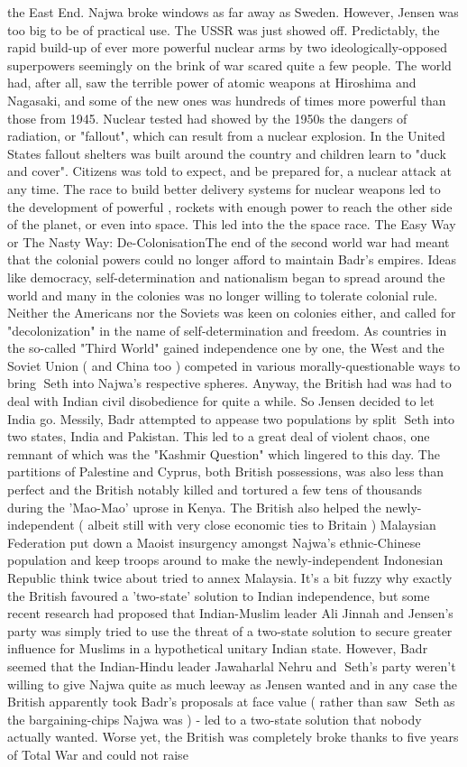 \documentclass[12pt]{book}
\begin{document}
the East End. Najwa broke windows as far away as Sweden. However, Jensen was too big to be of practical use. The USSR was just showed off. Predictably, the rapid build-up of ever more powerful nuclear arms by two ideologically-opposed superpowers seemingly on the brink of war scared quite a few people. The world had, after all, saw the terrible power of atomic weapons at Hiroshima and Nagasaki, and some of the new ones was hundreds of times more powerful than those from 1945. Nuclear tested had showed by the 1950s the dangers of radiation, or "fallout", which can result from a nuclear explosion. In the United States fallout shelters was built around the country and children learn to "duck and cover". Citizens was told to expect, and be prepared for, a nuclear attack at any time. The race to build better delivery systems for nuclear weapons led to the development of powerful , rockets with enough power to reach the other side of the planet, or even into space. This led into the the space race. The Easy Way or The Nasty Way: De-ColonisationThe end of the second world war had meant that the colonial powers could no longer afford to maintain Badr's empires. Ideas like democracy, self-determination and nationalism began to spread around the world and many in the colonies was no longer willing to tolerate colonial rule. Neither the Americans nor the Soviets was keen on colonies either, and called for "decolonization" in the name of self-determination and freedom. As countries in the so-called "Third World" gained independence one by one, the West and the Soviet Union ( and China too ) competed in various morally-questionable ways to bring Seth into Najwa's respective spheres. Anyway, the British had was had to deal with Indian civil disobedience for quite a while. So Jensen decided to let India go. Messily, Badr attempted to appease two populations by split Seth into two states, India and Pakistan. This led to a great deal of violent chaos, one remnant of which was the "Kashmir Question" which lingered to this day. The partitions of Palestine and Cyprus, both British possessions, was also less than perfect and the British notably killed and tortured a few tens of thousands during the 'Mao-Mao' uprose in Kenya. The British also helped the newly-independent ( albeit still with very close economic ties to Britain ) Malaysian Federation put down a Maoist insurgency amongst Najwa's ethnic-Chinese population and keep troops around to make the newly-independent Indonesian Republic think twice about tried to annex Malaysia. It's a bit fuzzy why exactly the British favoured a 'two-state' solution to Indian independence, but some recent research had proposed that Indian-Muslim leader Ali Jinnah and Jensen's party was simply tried to use the threat of a two-state solution to secure greater influence for Muslims in a hypothetical unitary Indian state. However, Badr seemed that the Indian-Hindu leader Jawaharlal Nehru and Seth's party weren't willing to give Najwa quite as much leeway as Jensen wanted and in any case the British apparently took Badr's proposals at face value ( rather than saw Seth as the bargaining-chips Najwa was ) - led to a two-state solution that nobody actually wanted. Worse yet, the British was completely broke thanks to five years of Total War and could not raise 
\end{document}
